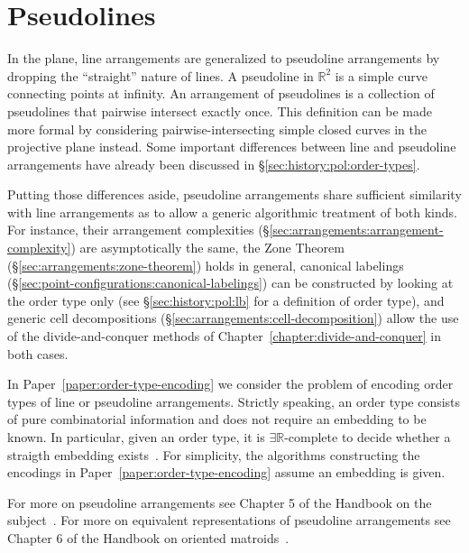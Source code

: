 \section{Pseudolines}

In the plane, line arrangements are generalized to pseudoline arrangements by
dropping the ``straight'' nature of lines.
%
A pseudoline in \(\mathbb{R}^2\) is a simple curve connecting points at
infinity.
An arrangement of pseudolines is a collection of pseudolines that pairwise
intersect exactly once.
%
This definition can be made more formal by considering pairwise-intersecting
simple closed curves in the projective plane instead.
%
Some important differences between line and pseudoline arrangements have
already been discussed in \S\ref{sec:history:pol:order-types}.

Putting those differences aside, pseudoline arrangements share sufficient
similarity with line arrangements as to allow a generic algorithmic
treatment of both kinds.
%
For instance,
%
their arrangement complexities
(\S\ref{sec:arrangements:arrangement-complexity})
are
asymptotically the same,
%
the Zone Theorem (\S\ref{sec:arrangements:zone-theorem}) holds in general,
%
canonical labelings (\S\ref{sec:point-configurations:canonical-labelings})
can be constructed by looking at the order type only
(see \S\ref{sec:history:pol:lb} for a definition of order type),
and generic cell decompositions
(\S\ref{sec:arrangements:cell-decomposition})
allow the use of the divide-and-conquer methods of
Chapter~\ref{chapter:divide-and-conquer} in both cases.

In Paper~\ref{paper:order-type-encoding} we consider the problem of encoding
order types of line or pseudoline arrangements.
%
Strictly speaking, an order type consists of pure combinatorial information and
does not require an embedding to be known.
%
In particular, given an order type, it is
\(\exists \mathbb{R}\)-complete to decide whether a straigth embedding
exists~\cite{Mne85,Mne88}.
%
For simplicity, the algorithms constructing the encodings in
Paper~\ref{paper:order-type-encoding} assume an embedding is given.

For more on pseudoline arrangements see Chapter
5 of the Handbook on the subject~\cite{Goo04}.
%
For more on equivalent representations of pseudoline arrangements see Chapter
6 of the Handbook on oriented matroids~\cite{RZ04}.


